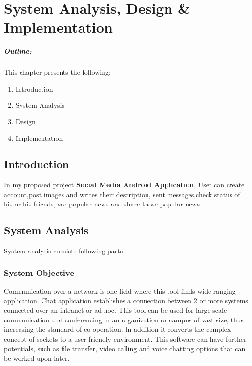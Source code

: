 \chapter{System Analysis, Design \& Implementation}\label{chap3}

\vspace*{50 ex}

\paragraph*{Outline:} This chapter presents the following:
\begin{enumerate}
\setlength{\itemsep}{-0.3em}
\item Introduction
\item System Analysis
\item Design
\item Implementation
\end{enumerate}
\newpage

\section{Introduction}\label{chap3:intro}

In my proposed project \textbf{Social Media Android Application}, User can create account,post images and writes their description, sent messages,check status of his or his friends, see popular news and share those popular news.

\section{System Analysis}
System analysis consists following parts
\subsection{System Objective}
Communication over a network is one field where this tool finds wide ranging application. Chat application establishes a connection between 2 or more systems connected over an intranet or ad-hoc. This tool can be used for large scale communication and conferencing in an organization or campus of vast size, thus increasing the standard of co-operation. In addition it
converts the complex concept of sockets to a user friendly environment. This software can have
further potentials, such as file transfer, video calling and voice chatting options that can be worked upon later.
